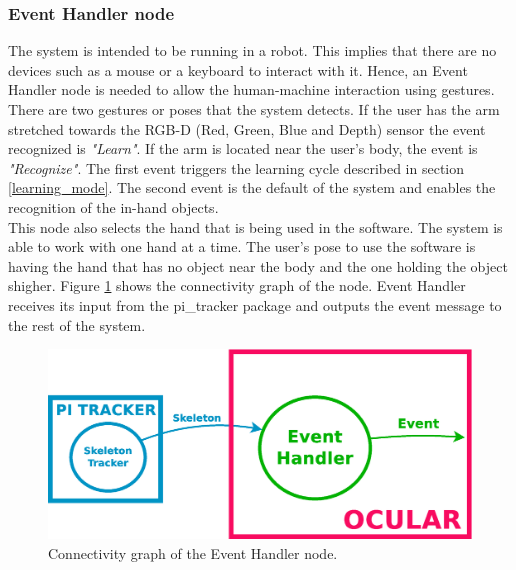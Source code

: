 
\subsubsection{Event Handler node}
\label{event_handler}
	The system is intended to be running in a robot. 
	This implies that there are no devices such as a mouse or a keyboard to interact with it. 
	Hence, an Event Handler node is needed to allow the human-machine interaction using gestures. 
	There are two gestures or poses that the system detects. 
	If the user has the arm stretched towards the RGB-D (Red, Green, Blue and Depth) sensor the event recognized is \textit{"Learn"}. 
	If the arm is located near the user's body, the event is \textit{"Recognize"}. 
	The first event triggers the learning cycle described in section \ref{learning_mode}. 
	The second event is the default of the system and enables the recognition of the in-hand objects. 
	\\

	This node also selects the hand that is being used in the software. 
	The system is able to work with one hand at a time. 
	The user's pose to use the software is having the hand that has no object near the body and the one holding the object shigher. 
	Figure \ref{node_event} shows the connectivity graph of the node. 
	Event Handler receives its input from the pi\_tracker package and outputs the event message to the rest of the system. 

	\vspace{0.5cm}
	\begin{figure}[H]
			\centering
			\includegraphics[width=0.5\linewidth]{img/diagrams/node_event.eps}
			\caption[Event Handler 3D node I/O]{Connectivity graph of the Event Handler node.}		
			\label{node_event}
		\end{figure}


